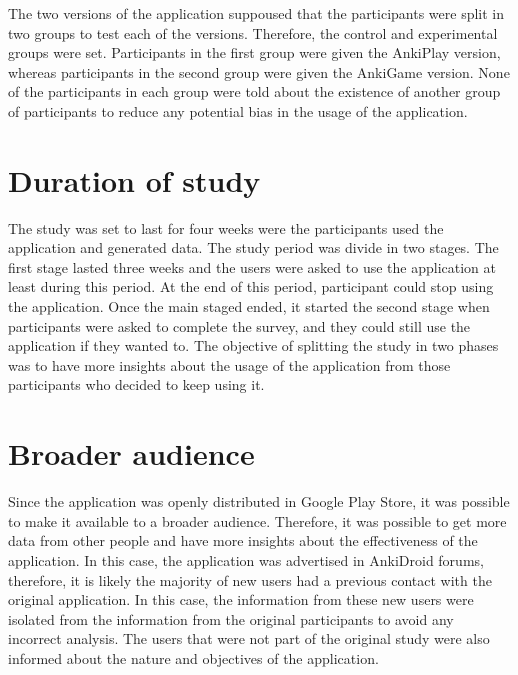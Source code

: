 The two versions of the application suppoused that the participants were split in two groups to test each of the versions. Therefore, the control and experimental groups were set. Participants in the first group were given the AnkiPlay version, whereas participants in the second group were given the AnkiGame version. None of the participants in each group were told about the existence of another group of participants to reduce any potential bias in the usage of the application.

\section{Duration of study}
The study was set to last for four weeks were the participants used the application and generated data. The study period was divide in two stages. The first stage lasted three weeks and the users were asked to use the application at least during this period. At the end of this period, participant could stop using the application. Once the main staged ended, it started the second stage when participants were asked to complete the survey, and they could still use the application if they wanted to. The objective of splitting the study in two phases was to have more insights about the usage of the application from those participants who decided to keep using it.

\section{Broader audience}
Since the application was openly distributed in Google Play Store, it was possible to make it available to a broader audience. Therefore, it was possible to get more data from other people and have more insights about the effectiveness of the application. In this case, the application was advertised in AnkiDroid forums, therefore, it is likely the majority of new users had a previous contact with the original application. In this case, the information from these new users were isolated from the information from the original participants to avoid any incorrect analysis. The users that were not part of the original study were also informed about the nature and objectives of the application.